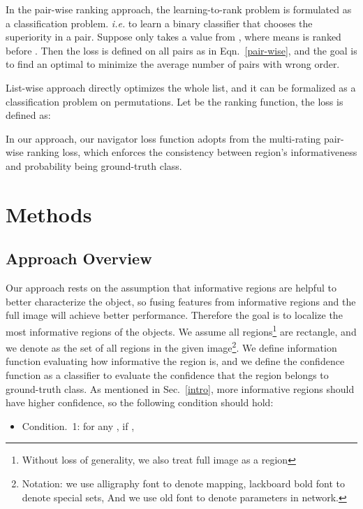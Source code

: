 \documentclass[runningheads]{llncs}
\begin{document}
In the pair-wise ranking approach, the learning-to-rank problem is formulated as a classification problem. \emph{i.e.} to learn a binary classifier that chooses the superiority in a pair. Suppose  only takes a value from , where  means  is ranked before . Then the loss is defined on all pairs as in Eqn.~\ref{pair-wise}, and the goal is to find an optimal  to minimize the average number of pairs with wrong order.



List-wise approach directly optimizes the whole list, and it can be formalized as a classification problem on permutations. Let  be the ranking function, the loss is defined as:



In our approach, our navigator loss function adopts from the multi-rating pair-wise ranking loss, which enforces the consistency between region's informativeness and probability being ground-truth class. 


\section{Methods}\label{methods}
\subsection{Approach Overview}
Our approach rests on the assumption that informative regions are helpful to better characterize the object, so fusing features from informative regions and the full image will achieve better performance. Therefore the goal is to localize the most informative regions of the objects. We assume all regions\footnote{Without loss of generality, we also treat full image as a region} are rectangle, and we denote  as the set of all regions in the given image\footnote{Notation: we use alligraphy font to denote mapping, lackboard bold font to denote special sets, And we use old font to denote parameters in network.}. We define information function  evaluating how informative the region  is, and we define the confidence function  as a classifier to evaluate the confidence that the region belongs to ground-truth class. As mentioned in Sec.~\ref{intro}, more informative regions should have higher confidence, so the following condition should hold:

\begin{itemize}
 	\item[] Condition.~1: for any , if , 
\end{itemize}
\end{document}

